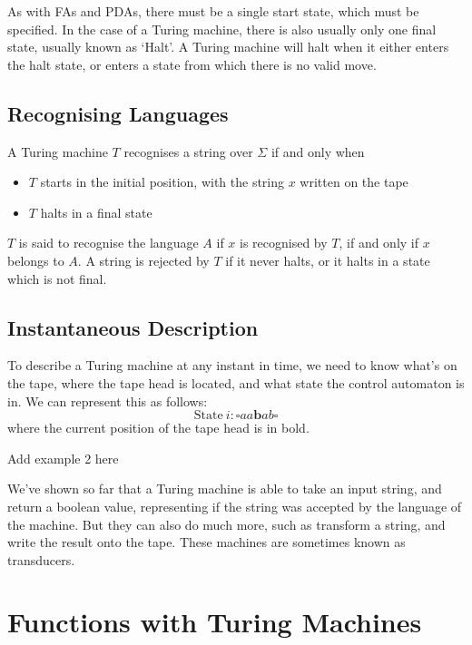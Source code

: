As with FAs and PDAs, there must be a single start state, which must be specified. In the case of a Turing machine,
 there is also usually only one final state, usually known as `Halt'. A Turing machine will halt when it either enters
 the halt state, or enters a state from which there is no valid move.

\subsection*{Recognising Languages}

A Turing machine $T$ recognises a string over $\Sigma$ if and only when
\begin{itemize}
  \item $T$ starts in the initial position, with the string $x$ written on the tape
  \item $T$ halts in a final state
\end{itemize}

$T$ is said to recognise the language $A$ if $x$ is recognised by $T$, if and only if $x$ belongs to $A$. A string is
 rejected by $T$ if it never halts, or it halts in a state which is not final.

\subsection*{Instantaneous Description}

To describe a Turing machine at any instant in time, we need to know what's on the tape, where the tape head is located,
 and what state the control automaton is in. We can represent this as follows:
\begin{equation*}
  \mathrm{State\ } i: \square a a \textbf{b} a b \square
\end{equation*}
where the current position of the tape head is in bold.

{\Huge Add example 2 here}




We've shown so far that a Turing machine is able to take an input string, and return a boolean value, representing if
 the string was accepted by the language of the machine. But they can also do much more, such as transform a string, and
 write the result onto the tape. These machines are sometimes known as transducers.

\section*{Functions with Turing Machines}


